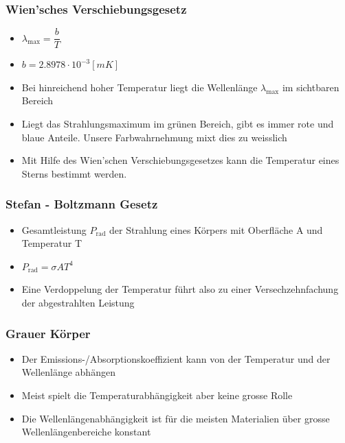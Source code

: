 \documentclass[8pt,a4paper]{scrartcl}
\begin{document}
\begin{multicols*}{3}
\begin{itemize}
							\end{itemize}	
					
						\subsubsection{Wien’sches Verschiebungsgesetz}
							\begin{itemize}\itemsep0pt
								\item $\lambda_{\text{max}}=\dfrac{b}{T}$
								\item $b = 2.8978 \cdot 10^{-3} [mK]$
								\item Bei hinreichend hoher Temperatur liegt die Wellenlänge $\lambda_{\text{max}}$ im sichtbaren Bereich
								\item Liegt das Strahlungsmaximum im grünen Bereich, gibt es immer rote und blaue Anteile. Unsere Farbwahrnehmung mixt dies zu weisslich
								\item Mit Hilfe des Wien’schen Verschiebungsgesetzes kann die Temperatur eines Sterns bestimmt werden.
							\end{itemize}	
						
						\subsubsection{Stefan - Boltzmann Gesetz}
							\begin{itemize}\itemsep0pt
								\item Gesamtleistung $P_{\text{rad}}$ der Strahlung eines Körpers mit Oberfläche A und Temperatur T
								\item $P_{\text{rad}} = \sigma AT^{4}$
								\item Eine Verdoppelung der Temperatur führt also zu einer Versechzehnfachung der abgestrahlten Leistung
							\end{itemize}	

						\subsubsection{Grauer Körper}
							\begin{itemize}\itemsep0pt
								
								\item Der Emissions-/Absorptionskoeffizient kann von der Temperatur und der Wellenlänge abhängen
								\item Meist spielt die Temperaturabhängigkeit aber keine grosse Rolle
								\item Die Wellenlängenabhängigkeit ist für die meisten Materialien über grosse Wellenlängenbereiche konstant	
							\end{itemize}	



\end{multicols*}

\end{document}
